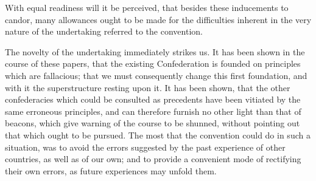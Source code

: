 With equal readiness will it be perceived, that besides these inducements to candor, many allowances ought to be made for the difficulties inherent in the very nature of the undertaking referred to the convention.

The novelty of the undertaking immediately strikes us. 
It has been shown in the course of these papers, that the existing Confederation is founded on principles which are fallacious; that we must consequently change this first foundation, and with it the superstructure resting upon it. 
It has been shown, that the other confederacies which could be consulted as precedents have been vitiated by the same erroneous principles, and can therefore furnish no other light than that of beacons, which give warning of the course to be shunned, without pointing out that which ought to be pursued. 
The most that the convention could do in such a situation, was to avoid the errors suggested by the past experience of other countries, as well as of our own; and to provide a convenient mode of rectifying their own errors, as future experiences may unfold them.

